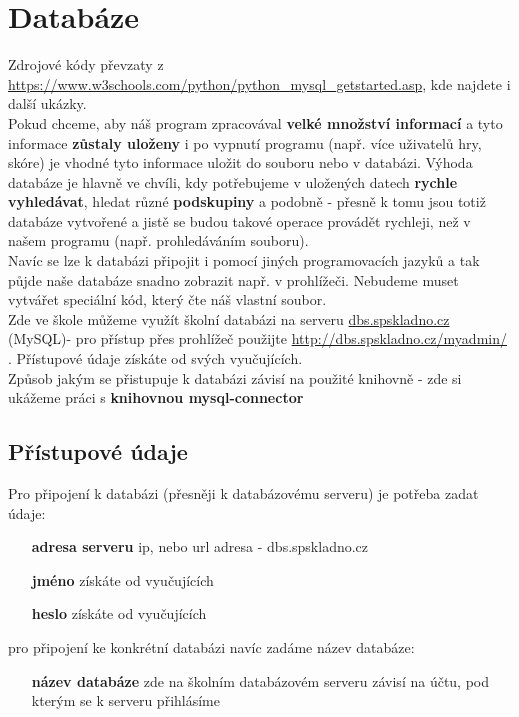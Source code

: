 \section{Databáze}
Zdrojové kódy převzaty z \url{https://www.w3schools.com/python/python_mysql_getstarted.asp}, kde najdete i další ukázky.\\
Pokud chceme, aby náš program zpracovával \textbf{velké množství informací} a tyto informace \textbf{zůstaly uloženy} i po vypnutí programu (např. více uživatelů hry, skóre) je vhodné tyto informace uložit do souboru nebo v databázi. Výhoda databáze je hlavně ve chvíli, kdy potřebujeme v uložených datech \textbf{rychle vyhledávat}, hledat různé \textbf{podskupiny} a podobně - přesně k tomu jsou totiž databáze vytvořené a jistě se budou takové operace provádět rychleji, než v našem programu (např. prohledáváním souboru).\\
Navíc se lze k databázi připojit i pomocí jiných programovacích jazyků a tak půjde naše databáze snadno zobrazit např. v prohlížeči. Nebudeme muset vytvářet speciální kód, který čte náš vlastní soubor.\\
Zde ve škole můžeme využít školní databázi na serveru \url{dbs.spskladno.cz} (MySQL)- pro přístup přes prohlížeč použijte \url{http://dbs.spskladno.cz/myadmin/} . Přístupové údaje získáte od svých vyučujících.\\
Způsob jakým se přistupuje k databázi závisí na použité knihovně - zde si ukážeme práci s \textbf{knihovnou mysql-connector}

\subsection{Přístupové údaje}
Pro připojení k databázi (přesněji k databázovému serveru) je potřeba zadat údaje:
\begin{enumerate}
\item[\textbf{adresa serveru}] ip, nebo url adresa - dbs.spskladno.cz
\item[\textbf{jméno}] získáte od vyučujících
\item[\textbf{heslo}] získáte od vyučujících
\end{enumerate}
pro připojení ke konkrétní databázi navíc zadáme název databáze:
\begin{enumerate} \setcounter{enumi}{4}
\item[\textbf{název databáze}] zde na školním databázovém serveru závisí na účtu, pod kterým se k serveru přihlásíme
\end{enumerate}

